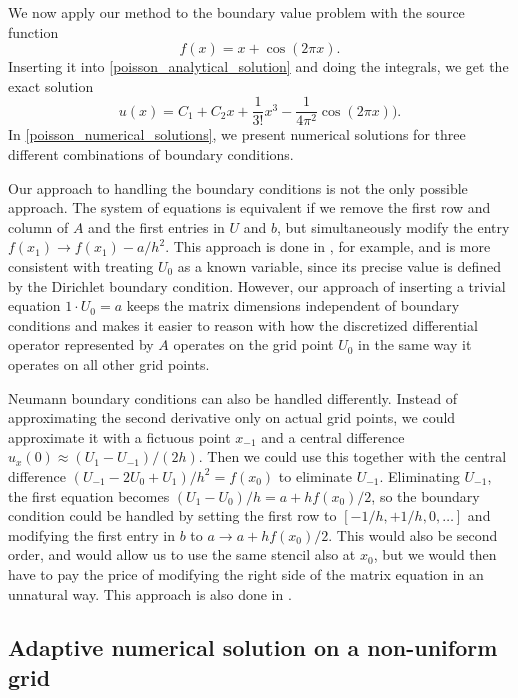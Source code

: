 We now apply our method to the boundary value problem with the source function 
\begin{equation*}
f(x) = x + \cos(2 \pi x).
\end{equation*}
Inserting it into \cref{poisson_analytical_solution} and doing the integrals, we get the exact solution
\begin{equation*}
u(x) = C_1 + C_2 x + \frac{1}{3!}x^3 - \frac{1}{4 \pi^2}\cos(2 \pi x)).
\end{equation*}
In \cref{poisson_numerical_solutions}, we present numerical solutions for three different combinations of boundary conditions.

Our approach to handling the boundary conditions is not the only possible approach.
The system of equations is equivalent if we remove the first row and column of $A$ and the first entries in $U$ and $b$, but simultaneously modify the entry $f(x_1) \rightarrow f(x_1) - a/h^2$.
This approach is done in \cite{owren}, for example, and is more consistent with treating $U_0$ as a known variable, since its precise value is defined by the Dirichlet boundary condition.
However, our approach of inserting a trivial equation $1 \cdot U_0 = a$ keeps the matrix dimensions independent of boundary conditions and makes it easier to reason with how the discretized differential operator represented by $A$ operates on the grid point $U_0$ in the same way it operates on all other grid points.

Neumann boundary conditions can also be handled differently.
Instead of approximating the second derivative only on actual grid points, we could approximate it with a fictuous point $x_{-1}$ and a central difference $u_x(0) \approx (U_1 - U_{-1}) / (2 h)$.
Then we could use this together with the central difference $(U_{-1} - 2 U_0 + U_1) / h^2 = f(x_0)$ to eliminate $U_{-1}$.
Eliminating $U_{-1}$, the first equation becomes $(U_1 - U_0) / h = a + h f(x_0) / 2$, so the boundary condition could be handled by setting the first row to $[-1/h, +1/h, 0, \dots]$ and modifying the first entry in $b$ to $a \rightarrow a + h f(x_0) / 2$.
This would also be second order, and would allow us to use the same stencil also at $x_0$, but we would then have to pay the price of modifying the right side of the matrix equation in an unnatural way.
This approach is also done in \cite{owren}.

\subsection{Adaptive numerical solution on a non-uniform grid}

